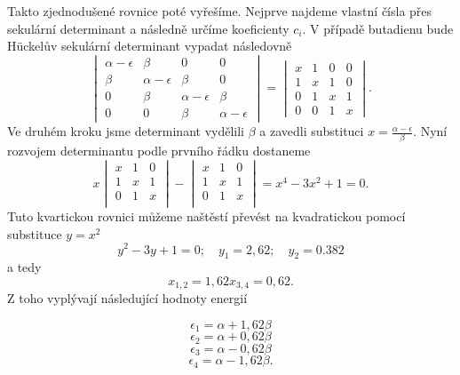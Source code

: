 Takto zjednodušené rovnice poté vyřešíme. Nejprve najdeme vlastní čísla přes sekulární determinant a následně určíme koeficienty $c_i$. V případě butadienu bude H\"{u}ckelův sekulární determinant vypadat následovně
\begin{equation}
\begin{vmatrix}
\alpha-\epsilon & \beta & 0 & 0  \\
\beta &\alpha-\epsilon & \beta & 0  \\
0 &\beta &\alpha-\epsilon & \beta  \\
0 & 0 & \beta &\alpha-\epsilon  
\end{vmatrix}
= 
\begin{vmatrix}
x & 1 & 0 & 0  \\
1 & x & 1 & 0  \\
0 & 1 & x & 1  \\
0 & 0 & 1 & x  
\end{vmatrix}
.
\end{equation}
Ve druhém kroku jsme determinant vydělili $\beta$ a zavedli substituci $x=\frac{\alpha-\epsilon}{\beta}$.
Nyní rozvojem determinantu podle prvního řádku dostaneme
\begin{equation}
x
\begin{vmatrix}
x & 1 & 0 \\
1 & x & 1 \\
0 & 1 & x \\
\end{vmatrix}
-
\begin{vmatrix}
x & 1 & 0 \\
1 & x & 1 \\
0 & 1 & x \\
\end{vmatrix}
=x^4-3x^2+1=0 . \nonumber
\end{equation}
Tuto kvartickou rovnici můžeme naštěstí převést na kvadratickou pomocí substituce $y=x^2$
\begin{equation}
y^2-3y+1=0;\quad y_1=2,62;\quad y_2=0.382 \nonumber
\end{equation}
a tedy
\begin{equation}
x_{1,2}=1,62 \nonumber
x_{3,4}=0,62 .\nonumber
\end{equation}
Z toho vyplývají následující hodnoty energií

$$ \epsilon_1 = \alpha+1,62\beta $$
$$ \epsilon_2 = \alpha+0,62\beta $$
$$ \epsilon_3 = \alpha-0,62\beta $$
$$ \epsilon_4 = \alpha-1,62\beta . $$

